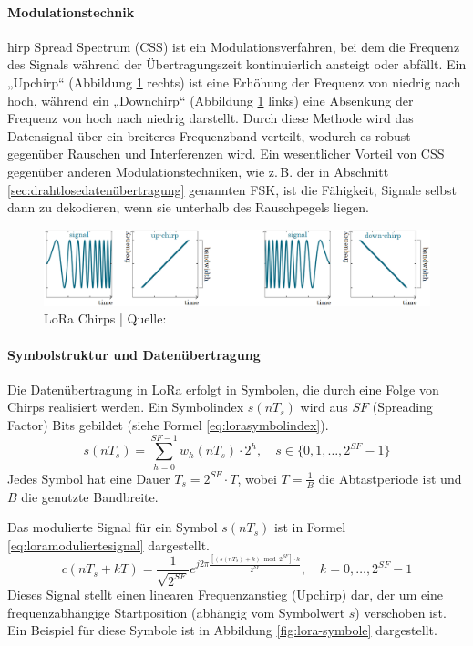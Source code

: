\paragraph*{Modulationstechnik}  
hirp Spread Spectrum (CSS) ist ein Modulationsverfahren, bei dem die Frequenz des Signals während der Übertragungszeit kontinuierlich ansteigt oder abfällt.
Ein „Upchirp“ (Abbildung \ref{fig:lora-chirp} rechts) ist eine Erhöhung der Frequenz von niedrig nach hoch, während ein „Downchirp“ (Abbildung \ref{fig:lora-chirp} links) eine Absenkung der Frequenz von hoch nach niedrig darstellt. 
Durch diese Methode wird das Datensignal über ein breiteres Frequenzband verteilt, wodurch es robust gegenüber Rauschen und Interferenzen wird.  
Ein wesentlicher Vorteil von CSS gegenüber anderen Modulationstechniken, wie z.\,B. der in Abschnitt \ref{sec:drahtlosedatenübertragung} genannten FSK, ist die Fähigkeit, Signale selbst dann zu dekodieren, wenn sie unterhalb des Rauschpegels liegen.

\begin{figure}[H]
\centering
\includegraphics[scale=.4]{figures/asstes/lora-chirps.png}
\caption{LoRa Chirps | Quelle: \cite{tulkaLoRaSpreadingFactor}}
\label{fig:lora-chirp}
\end{figure}

\paragraph*{Symbolstruktur und Datenübertragung}  
Die Datenübertragung in LoRa erfolgt in Symbolen, die durch eine Folge von Chirps realisiert werden. 
Ein Symbolindex $s(nT_s)$ wird aus $SF$ (Spreading Factor) Bits gebildet (siehe Formel \ref{eq:lorasymbolindex}).
\begin{equation}
\label{eq:lorasymbolindex}
s(nT_s) = \sum_{h=0}^{SF-1} w_h(nT_s) \cdot 2^h, \quad s \in \{0,1,\dots,2^{SF}-1\}
\end{equation}
Jedes Symbol hat eine Dauer $T_s = 2^{SF} \cdot T$, wobei $T = \frac{1}{B}$ die Abtastperiode ist und $B$ die genutzte Bandbreite.

Das modulierte Signal für ein Symbol $s(nT_s)$ ist in Formel \ref{eq:loramoduliertesignal} dargestellt.
\begin{equation}
\label{eq:loramoduliertesignal}
c(nT_s + kT) = \frac{1}{\sqrt{2^{SF}}} e^{j 2\pi \frac{[(s(nT_s)+k) \bmod 2^{SF}] \cdot k}{2^{SF}}}, \quad k=0,\dots, 2^{SF}-1
\end{equation}
Dieses Signal stellt einen linearen Frequenzanstieg (Upchirp) dar, der um eine frequenzabhängige Startposition (abhängig vom Symbolwert $s$) verschoben ist. 
Ein Beispiel für diese Symbole ist in Abbildung \ref{fig:lora-symbole} dargestellt.

